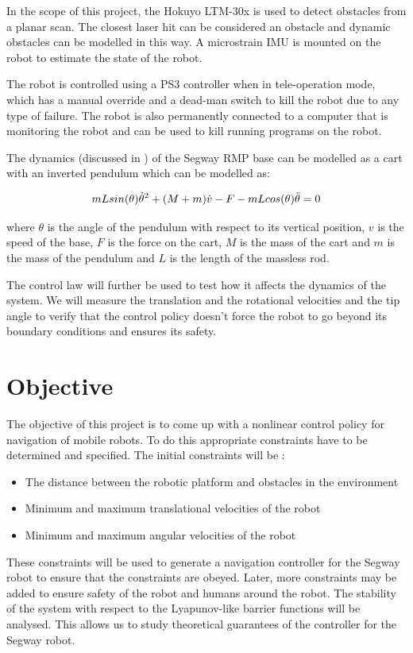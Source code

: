 \documentclass[journal]{IEEEtran}
\begin{document}
In the scope of this project, the Hokuyo LTM-30x is used to detect obstacles from a planar scan. The closest laser hit can be considered an obstacle and dynamic obstacles can be modelled in this way. A microstrain IMU is mounted on the robot to estimate the state of the robot.

The robot is controlled using a PS3 controller when in tele-operation mode, which has a manual override and a dead-man switch to kill the robot due to any type of failure. The robot is also permanently connected to a computer that is monitoring the robot and can be used to kill running programs on the robot.


The dynamics (discussed in \cite{castro2012modeling}) of the Segway RMP base can be modelled as a cart with an inverted pendulum which can be modelled as:

\begin{equation}
\centering
 mLsin(\theta)\dot{\theta}^2 + (M+m)\dot{v} - F - mLcos(\theta)\ddot{\theta} = 0 
\end{equation}

where $\theta$ is the angle of the pendulum with respect to its vertical position, $v$ is the speed of the base, $F$ is the force on the cart, $M$ is the mass of the cart and $m$ is the mass of the pendulum and $L$ is the length of the massless rod.

The control law will further be used to test how it affects the dynamics of the system. We will measure the translation and the rotational velocities and the tip angle to verify that the control policy doesn't force the robot to go beyond its boundary conditions and ensures its safety.


\section{Objective}
The objective of this project is to come up with a nonlinear control policy for navigation of mobile robots. To do this appropriate constraints have to be determined and specified. The initial constraints will be : 
\begin{itemize}
    \item The distance between the robotic platform and obstacles in the environment
    \item Minimum and maximum translational velocities of the robot
    \item Minimum and maximum angular velocities of the robot
\end{itemize}
These constraints will be used to generate a navigation controller for the Segway robot to ensure that the constraints are obeyed. Later, more constraints may be added to ensure safety of the robot and humans around the robot. The stability of the system with respect to the Lyapunov-like barrier functions will be analysed. This allows us to study theoretical guarantees of the controller for the Segway robot.
\end{document}
